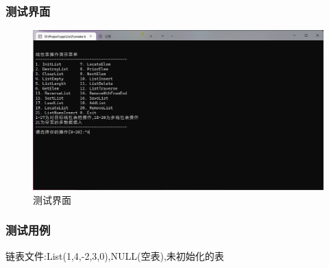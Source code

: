 \documentclass[supercite]{HustGraduPaper}
\theoremstyle{definition}
\begin{document}
\subsubsection{测试界面}
\begin{figure}[htb] %
	\begin{center}
		\includegraphics[scale=0.5]{images/p1-1.png}
		\caption{测试界面}
		\label{fig1-1}
	\end{center}
\end{figure}
\subsubsection{测试用例}
链表文件:List(1,4,-2,3,0),NULL(空表),未初始化的表
\newpage
\end{document}
